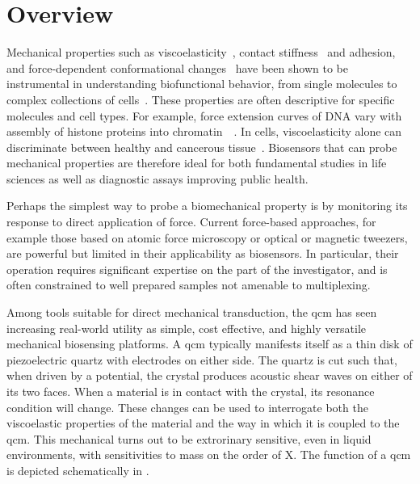 \section{Overview}
Mechanical properties such as
viscoelasticity~\cite{steinem2007piezoelectric}, contact
stiffness~\cite{johannsman2007contacts} and adhesion, and force-dependent
conformational changes~\cite{fant2000adsorption} have been shown to be
instrumental in understanding biofunctional behavior, from single molecules
to complex collections of cells~\cite{li2008thickness}. These properties
are often descriptive for specific molecules and cell types. For example,
force extension curves of DNA vary with assembly of histone proteins into
chromatin~\cite{cui2000pulling}~\cite{larson2012trigger}. In cells,
viscoelasticity alone can discriminate between healthy and cancerous
tissue~\cite{rebelo2013comparison}.  Biosensors that can probe mechanical
properties are therefore ideal for both fundamental studies in life
sciences as well as diagnostic assays improving public health.

Perhaps the simplest way to probe a biomechanical property is by monitoring
its response to direct application of force. Current force-based
approaches, for example those based on atomic force microscopy or optical
or magnetic tweezers, are powerful but limited in their applicability as
biosensors. In particular, their operation requires significant expertise
on the part of the investigator, and is often constrained to well prepared
samples not amenable to multiplexing.

Among tools suitable for direct mechanical transduction, the \gls{qcm}
has seen increasing real-world utility as simple, cost
effective, and highly versatile mechanical biosensing platforms.  A \gls{qcm}
typically manifests itself as a thin disk of piezoelectric quartz with
electrodes on either side.  The quartz is cut such that, when driven by a
potential, the crystal produces acoustic shear waves on either of its two
faces.  When a material is in contact with the crystal, its resonance
condition will change.  These changes can be used to interrogate both the
viscoelastic properties of the material and the way in which it is coupled
to the \gls{qcm}.  This mechanical turns out to be extrorinary sensitive, even in
liquid environments, with sensitivities to mass on the order of X.  The
function of a \gls{qcm} is depicted schematically in .


